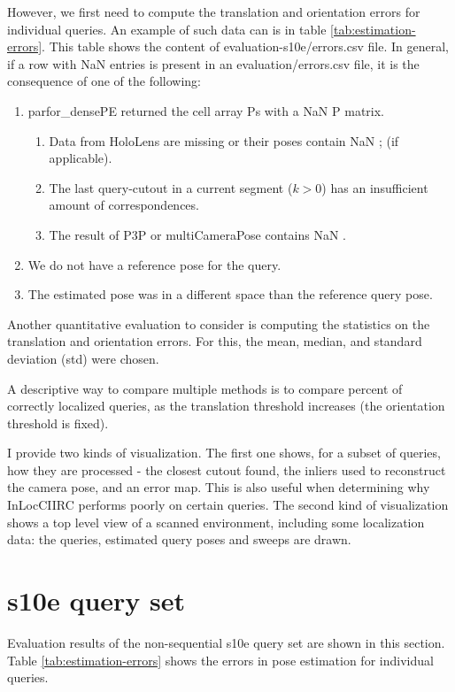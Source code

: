 \documentclass[twoside]{ctuthesis}
\theoremstyle{plain}
\theoremstyle{definition}
\theoremstyle{note}
\newcommand{\code}[1]{{\ttfamily #1%
}}
\begin{document}
However, we first need to compute the translation and orientation errors for individual queries. An example of such data can is in table \ref{tab:estimation-errors}. This table shows the content of \code{evaluation-s10e/errors.csv} file. In general, if a row with \code{NaN} entries is present in an \code{evaluation/errors.csv} file, it is the consequence of one of the following:

\begin{enumerate}[label=\normalfont\itembox{\alph*)}]
	\item \code{parfor\_densePE} returned the cell array \code{Ps} with a \code{NaN} P matrix.
	\begin{enumerate}
		\item Data from HoloLens are missing or their poses contain \code{NaN}; (if applicable).
		\item The last query-cutout in a current segment ($k>0$) has an insufficient amount of correspondences.
		\item The result of P3P or \code{multiCameraPose} contains \code{NaN}.
	\end{enumerate}
	\item We do not have a reference pose for the query.
	\item The estimated pose was in a different space than the reference query pose.
\end{enumerate}

Another quantitative evaluation to consider is computing the statistics on the translation and orientation errors. For this, the mean, median, and standard deviation (std) were chosen.

A descriptive way to compare multiple methods is to compare percent of correctly localized queries, as the translation threshold increases (the orientation threshold is fixed).

I provide two kinds of visualization. The first one shows, for a subset of queries, how they are processed - the closest cutout found, the inliers used to reconstruct the camera pose, and an error map. This is also useful when determining why InLocCIIRC performs poorly on certain queries. The second kind of visualization shows a top level view of a scanned environment, including some localization data: the queries, estimated query poses and sweeps are drawn.

\section{s10e query set}
Evaluation results of the non-sequential s10e query set are shown in this section. Table \ref{tab:estimation-errors} shows the errors in pose estimation for individual queries. 
\end{document}
